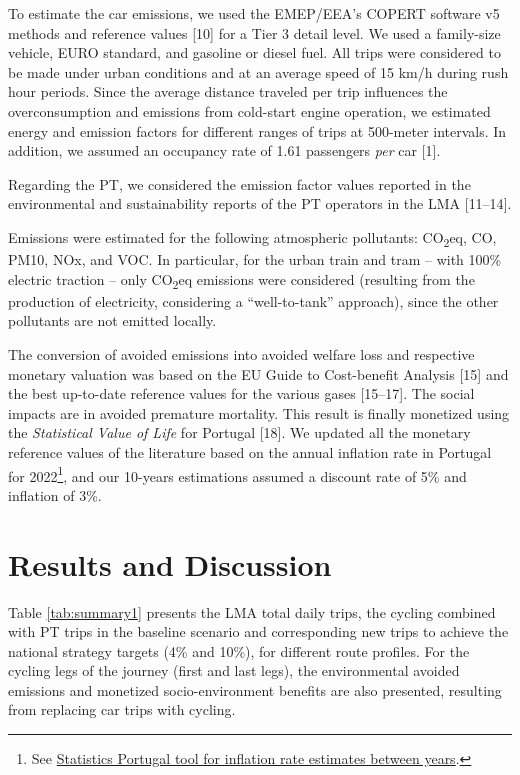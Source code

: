 \documentclass[runningheads]{llncs}
\begin{document}
To estimate the car emissions, we used the EMEP/EEA's COPERT software v5
methods and reference values {[}10{]} for a Tier 3 detail level. We used
a family-size vehicle, EURO standard, and gasoline or diesel fuel. All
trips were considered to be made under urban conditions and at an
average speed of 15 km/h during rush hour periods. Since the average
distance traveled per trip influences the overconsumption and emissions
from cold-start engine operation, we estimated energy and emission
factors for different ranges of trips at 500-meter intervals. In
addition, we assumed an occupancy rate of 1.61 passengers \emph{per} car
{[}1{]}.

Regarding the PT, we considered the emission factor values reported in
the environmental and sustainability reports of the PT operators in the
LMA {[}11--14{]}.

Emissions were estimated for the following atmospheric pollutants:
CO\textsubscript{2}eq, CO, PM10, NOx, and VOC. In particular, for the
urban train and tram -- with 100\% electric traction -- only
CO\textsubscript{2}eq emissions were considered (resulting from the
production of electricity, considering a ``well-to-tank'' approach),
since the other pollutants are not emitted locally.

The conversion of avoided emissions into avoided welfare loss and
respective monetary valuation was based on the EU Guide to Cost-benefit
Analysis {[}15{]} and the best up-to-date reference values for the
various gases {[}15--17{]}. The social impacts are in avoided premature
mortality. This result is finally monetized using the \emph{Statistical
Value of Life} for Portugal {[}18{]}. We updated all the monetary
reference values of the literature based on the annual inflation rate in
Portugal for 2022\footnote{See
  \href{https://www.ine.pt/xportal/xmain?xpid=INE\&xpgid=ipc}{Statistics
  Portugal tool for inflation rate estimates between years}.}, and our
10-years estimations assumed a discount rate of 5\% and inflation of
3\%.

\hypertarget{results-and-discussion}{%
\section{Results and Discussion}\label{results-and-discussion}}

Table \ref{tab:summary1} presents the LMA total daily trips, the cycling
combined with PT trips in the baseline scenario and corresponding new
trips to achieve the national strategy targets (4\% and 10\%), for
different route profiles. For the cycling legs of the journey (first and
last legs), the environmental avoided emissions and monetized
socio-environment benefits are also presented, resulting from replacing
car trips with cycling.
\end{document}
